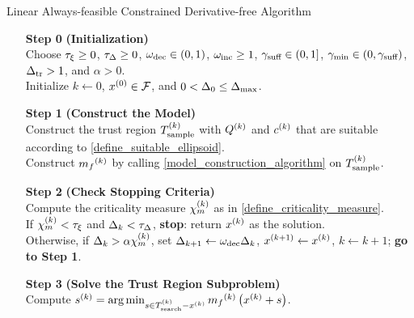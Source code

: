 \documentclass{article}
\begin{document}
{
\begin{fullwidth}[leftmargin=0in, rightmargin=0in, width=\linewidth-0.5in]
\begin{flushleft}

\begin{algorithm}[H]
    \caption{Linear Always-feasible Constrained Derivative-free Algorithm}
    \label{linearly_constrained_dfo_simple}
    \begin{itemize}
        \item[\textbf{Step 0}] \textbf{(Initialization)} \\
            Choose
            $\tau_{\xi}\ge 0$,
            $\tau_{\Delta} \ge 0$, 
            $\omega_{\text{dec}} \in (0,1)$, 
            $\omega_{\text{inc}} \ge 1$,  
            $ \gamma_{\textrm{suff}} \in (0,1]$, 
            $\gamma_{\textrm{min}} \in (0,\gamma_{\textrm{suff}})$,
            $\Delta_{\textrm{tr}} > 1$,
			and $\alpha > 0$. \\
            Initialize
            $k\gets 0$,
            $x^{(0)} \in {\mathcal F}$,
            and $0 < \Delta_0 \le {\Delta_{\textrm{max}}}$.
            
        \item[\textbf{Step 1}] \textbf{(Construct the Model)} \\
           Construct the trust region ${T_{\text{sample}}^{(k)}}$ with ${Q^{(k)}}$ and $c^{(k)}$ that are suitable according to \cref{define_suitable_ellipsoid}. \\
           Construct ${{m}_f}^{(k)}$ by calling \cref{model_construction_algorithm} on ${T_{\text{sample}}^{(k)}}$.
        
        \item[\textbf{Step 2}] \textbf{(Check Stopping Criteria)} \\
            Compute the criticality measure ${\chi_m^{(k)}}$ as in \cref{define_criticality_measure}. \\
            If $ {\chi_m^{(k)}} < \tau_{\xi} $ and $\Delta_k <\tau_{\Delta}$,  {\bf stop}: return $x^{(k)}$ as the solution.   \\
            Otherwise, if $\Delta_k > \alpha {\chi_m^{(k)}}$,   
            set 
                $\Delta_{k+1} \gets \omega_{\text{dec}}\Delta_k$, 
                ${{x}^{(k+1)}} \gets x^{(k)}$,
                $k \gets k+1$; {\bf go to Step 1}.
           
        
        \item[\textbf{Step 3}] \textbf{(Solve the Trust Region Subproblem)} \\
            Compute ${{s}^{(k)}} = \operatorname*{arg\,min}_{s \in {T_{\text{search}}^{(k)}} - x^{(k)}} {{m}_f}^{(k)}\left(x^{(k)} + s\right)$. 
            

\end{itemize}
\end{algorithm}
\end{flushleft}
\end{fullwidth}}
\end{document}
